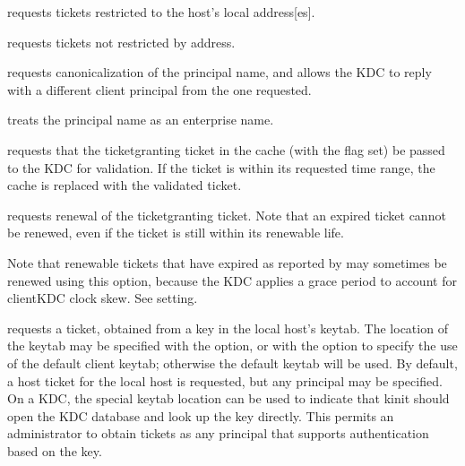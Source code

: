 \documentclass[letterpaper,10pt,english]{sphinxmanual}
\begin{document}
\begin{description}
\sphinxAtStartPar
requests tickets restricted to the host’s local address{[}es{]}.

\sphinxAtStartPar
requests tickets not restricted by address.

\sphinxAtStartPar
requests canonicalization of the principal name, and allows the
KDC to reply with a different client principal from the one
requested.

\sphinxAtStartPar
treats the principal name as an enterprise name.

\sphinxAtStartPar
requests that the ticket\sphinxhyphen{}granting ticket in the cache (with the
 flag set) be passed to the KDC for validation.  If the
ticket is within its requested time range, the cache is replaced
with the validated ticket.

\sphinxAtStartPar
requests renewal of the ticket\sphinxhyphen{}granting ticket.  Note that an
expired ticket cannot be renewed, even if the ticket is still
within its renewable life.

\sphinxAtStartPar
Note that renewable tickets that have expired as reported by
{\hyperref[\detokenize{user/user_commands/klist:klist-1}]{}} may sometimes be renewed using this option,
because the KDC applies a grace period to account for client\sphinxhyphen{}KDC
clock skew.  See   setting.

\sphinxAtStartPar
requests a ticket, obtained from a key in the local host’s keytab.
The location of the keytab may be specified with the 
 option, or with the  option to specify the use
of the default client keytab; otherwise the default keytab will be
used.  By default, a host ticket for the local host is requested,
but any principal may be specified.  On a KDC, the special keytab
location  can be used to indicate that kinit should open
the KDC database and look up the key directly.  This permits an
administrator to obtain tickets as any principal that supports
authentication based on the key.


\end{description}
\end{document}
